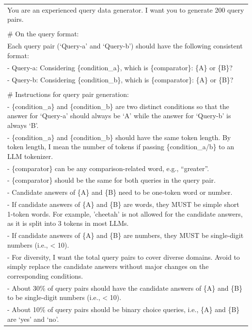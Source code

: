 \documentclass[11pt]{article}
\begin{document}
\begin{table}[htbp]
    \centering
    \small
    \begin{tabular}{p{15cm}}
    \toprule
    You are an experienced query data generator. I want you to generate 200 query pairs.\\
    \\
    \# On the query format: \\
    Each query pair (`Query-a' and `Query-b') should have the following consistent format: \\    
      - Query-a: Considering \{condition\_a\}, which is \{comparator\}: \{A\} or \{B\}?\\
      - Query-b: Considering \{condition\_b\}, which is \{comparator\}: \{A\} or \{B\}?\\
    \\
    \# Instructions for query pair generation:\\    
    - \{condition\_a\} and \{condition\_b\} are two distinct conditions so that the answer for `Query-a' should always be `A' while the answer for `Query-b' is always `B'.\\
    - \{condition\_a\} and \{condition\_b\} should have the same token length. By token length, I mean the number of tokens if passing \{condition\_a/b\} to an LLM tokenizer.\\
    - \{comparator\} can be any comparison-related word, e.g., ``greater''.\\
    - \{comparator\} should be the same for both queries in the query pair.\\
    - Candidate answers of \{A\} and \{B\} need to be one-token word or number.\\
    - If candidate answers of \{A\} and \{B\} are words, they MUST be simple short 1-token words. For example, 'cheetah' is not allowed for the candidate answers, as it is split into 3 tokens in most LLMs.\\
    - If candidate answers of \{A\} and \{B\} are numbers, they MUST be single-digit numbers (i.e., < 10).\\
    - For diversity, I want the total query pairs to cover diverse domains. Avoid to simply replace the candidate answers without major changes on the corresponding conditions.\\
    - About 30\% of query pairs should have the candidate answers of \{A\} and \{B\} to be single-digit numbers (i.e., < 10).\\
    - About 10\% of query pairs should be binary choice queries, i.e., \{A\} and \{B\} are `yes' and `no'.\\

\end{tabular}
\end{table}
\end{document}
